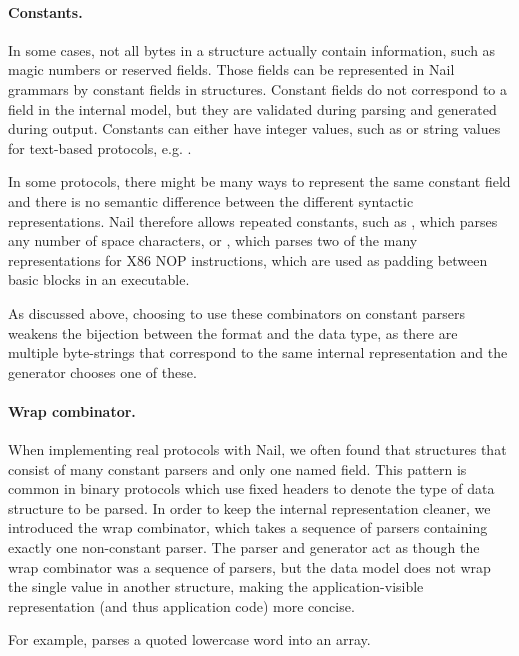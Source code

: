 
\paragraph{Constants.}
In some cases, not all bytes in a structure actually contain information, such as magic numbers or
reserved fields. Those fields can be represented in Nail grammars by constant fields in structures.
Constant fields do not correspond to a field in the internal model, but they are validated during
parsing and generated during output.  Constants can either have integer values, such as
 or string values for text-based protocols, e.g. .

In some protocols, there might be many ways to represent the same constant field
and there is no semantic difference between the different syntactic representations.
Nail therefore allows repeated constants, such as , which parses any number of space characters, or
, which parses two of the many representations for X86
NOP instructions, which are used as padding between basic blocks in an executable. 

As discussed above, choosing to use these combinators on constant parsers
weakens the bijection between the format and the data type, as there are
multiple byte-strings that correspond to the same internal representation and
the generator chooses one of these.
\paragraph{Wrap combinator.} 
When implementing real protocols with Nail, we often found that
structures that consist of many constant parsers and only one named field. This pattern is
common in binary protocols which use fixed headers to denote the type of data
structure to be parsed.  In order to keep the internal representation cleaner,
we introduced the wrap combinator, which takes a sequence of parsers containing
exactly one non-constant parser. The parser and generator act as though the wrap
combinator was a sequence of parsers, but the data model does not wrap the
single value in another structure, making the application-visible representation
(and thus application code) more concise.


For example,  parses a quoted
lowercase word into an array.

